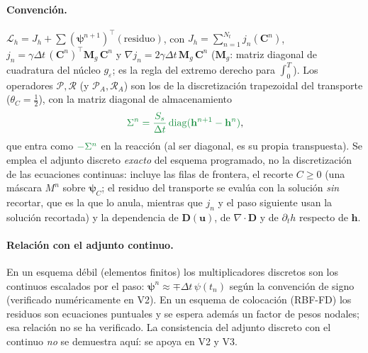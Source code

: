 \documentclass[11pt]{article}
\numberwithin{equation}{section}
\theoremstyle{plain}
\theoremstyle{definition}
\theoremstyle{remark}
\newcommand{\bu}{\mathbf{u}}
\newcommand{\Ceps}{g_\varepsilon}              %
\newcommand{\alm}[1]{{\color{cAlm}#1}}
\begin{document}
\paragraph{Convención.} $\mathcal{L}_h=J_h+\sum(\boldsymbol\psi^{n+1})^\top(\text{residuo})$, con
$J_h=\sum_{n=1}^{N_t}j_n(\mathbf{C}^n)$, $j_n=\gamma\Delta t\,(\mathbf{C}^n)^\top \mathbf{M}_g\,\mathbf{C}^n$ y
$\nabla j_n=2\gamma\Delta t\,\mathbf{M}_g\,\mathbf{C}^n$ ($\mathbf{M}_g$: matriz diagonal de cuadratura del núcleo $\Ceps$; es la regla del extremo derecho para $\int_0^T$).
Los operadores $\mathcal{P},\mathcal{R}$ (y $\mathcal{P}_A,\mathcal{R}_A$) son los de la discretización trapezoidal del transporte ($\theta_C=\tfrac12$), con la matriz
diagonal de almacenamiento
\[
\alm{\Sigma^n=\frac{S_s}{\Delta t}\,\mathrm{diag}(\mathbf{h}^{n+1}-\mathbf{h}^n)},
\]
que entra como $\alm{-\Sigma^n}$ en la reacción (al ser diagonal, es su propia transpuesta). Se emplea el adjunto
discreto \emph{exacto} del esquema programado, no la discretización de las ecuaciones continuas: incluye las filas de
frontera, el recorte $C\ge0$ (una máscara $M^n$ sobre $\boldsymbol\psi_C$; el residuo del transporte se evalúa con la solución
\emph{sin} recortar, que es la que lo anula, mientras que $j_n$ y el paso siguiente usan la solución recortada) y la dependencia de $\mathbf{D}(\bu)$, de $\nabla\!\cdot\mathbf{D}$ y de
$\partial_th$ respecto de $\mathbf{h}$.

\paragraph{Relación con el adjunto continuo.} En un esquema débil (elementos finitos) los multiplicadores discretos son los continuos escalados por el paso: $\boldsymbol\psi^n\approx\mp\Delta t\,\psi(t_n)$ según la convención de signo
(verificado numéricamente en V2). En un esquema de colocación (RBF-FD) los residuos son ecuaciones puntuales y se espera además un factor de pesos nodales; esa relación no se ha verificado.
La consistencia del adjunto discreto con el continuo \emph{no} se demuestra aquí: se apoya en V2 y V3.
\end{document}
